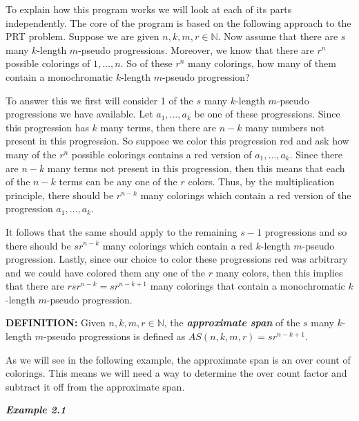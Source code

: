 \documentclass[12pt, a4paper]{article}
\begin{document}
To explain how this program works we will look at each of its parts independently. The core of the program is based on the following approach to the PRT problem. Suppose we are given $n,k,m,r\in\mathbb{N}$. Now assume that there are $s$ many $k$-length $m$-pseudo progressions. Moreover, we know that there are $r^n$ possible colorings of $1,\dots,n$. So of these $r^n$ many colorings, how many of them contain a monochromatic $k$-length $m$-pseudo progression?\par
To answer this we first will consider 1 of the $s$ many $k$-length $m$-pseudo progressions we have available. Let $a_1,\dots,a_k$ be one of these progressions. Since this progression has $k$ many terms, then there are $n-k$ many numbers not present in this progression. So suppose we color this progression red and ask how many of the $r^n$ possible colorings contains a red version of $a_1,\dots,a_k$. Since there are $n-k$ many terms not present in this progression, then this means that each of the $n-k$ terms can be any one of the $r$ colors. Thus, by the multiplication principle, there should be $r^{n-k}$ many colorings which contain a red version of the progression $a_1,\dots,a_k$. \par
It follows that the same should apply to the remaining $s-1$ progressions and so there should be $sr^{n-k}$ many colorings which contain a red $k$-length $m$-pseudo progression. Lastly, since our choice to color these progressions red was arbitrary and we could have colored them any one of the $r$ many colors, then this implies that there are $rsr^{n-k}=sr^{n-k+1}$ many colorings that contain a monochromatic $k$-length $m$-pseudo progression.

\vspace{6mm}

\noindent\textbf{DEFINITION: } Given $n,k,m,r\in\mathbb{N}$, the \textit{\textbf{approximate span}} of the $s$ many $k$-length $m$-pseudo progressions is defined as $AS(n,k,m,r)=sr^{n-k+1}$.

\vspace{6mm}

As we will see in the following example, the approximate span is an over count of colorings. This means we will need a way to determine the over count factor and subtract it off from the approximate span.

\vspace{6mm}

\noindent\textit{\textbf{Example 2.1}}

\vspace{2mm}
\end{document}
